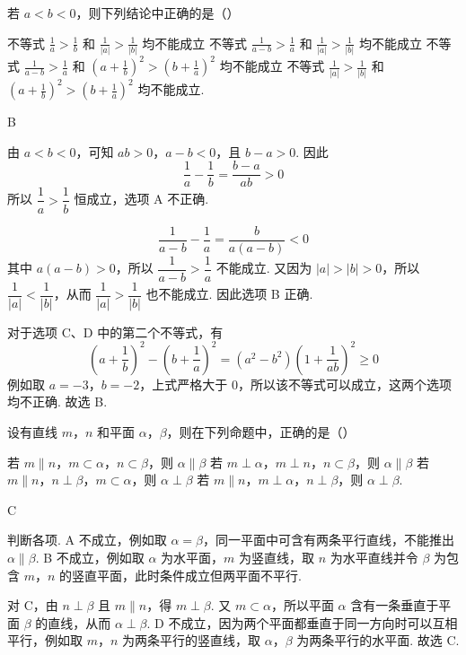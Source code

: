 \begin{problem}
若 \(a < b < 0\)，则下列结论中正确的是（\quad）

\choices
    {不等式 \(\frac{1}{a} > \frac{1}{b}\) 和 \(\frac{1}{|a|} > \frac{1}{|b|}\) 均不能成立}
    {不等式 \(\frac{1}{a - b} > \frac{1}{a}\) 和 \(\frac{1}{|a|} > \frac{1}{|b|}\) 均不能成立}
    {不等式 \(\frac{1}{a - b} > \frac{1}{a}\) 和 \(\left(a + \frac{1}{b}\right)^2 > \left(b + \frac{1}{a}\right)^2\) 均不能成立}
    {不等式 \(\frac{1}{|a|} > \frac{1}{|b|}\) 和 \(\left(a + \frac{1}{b}\right)^2 > \left(b + \frac{1}{a}\right)^2\) 均不能成立.}
\end{problem}

\begin{answer}
B
\end{answer}

\begin{solution}
由 \(a<b<0\)，可知 \(ab>0\)，\(a-b<0\)，且 \(b-a>0\). 因此
\[
\frac1a-\frac1b=\frac{b-a}{ab}>0
\]
所以 \(\dfrac1a>\dfrac1b\) 恒成立，选项 A 不正确.

\[
\frac1{a-b}-\frac1a=\frac{b}{a(a-b)}<0
\]
其中 \(a(a-b)>0\)，所以 \(\dfrac1{a-b}>\dfrac1a\) 不能成立. 又因为
\(|a|>|b|>0\)，所以 \(\dfrac1{|a|}<\dfrac1{|b|}\)，从而 \(\dfrac1{|a|}>\dfrac1{|b|}\) 也不能成立. 因此选项 B 正确.

对于选项 C、D 中的第二个不等式，有
\[
\left(a+\frac1b\right)^2-\left(b+\frac1a\right)^2
=(a^2-b^2)\left(1+\frac1{ab}\right)^2\ge0
\]
例如取 \(a=-3\)，\(b=-2\)，上式严格大于 \(0\)，所以该不等式可以成立，这两个选项均不正确. 故选 B.
\end{solution}

\begin{problem}
设有直线 \(m\)，\(n\) 和平面 \(\alpha\)，\(\beta\)，则在下列命题中，正确的是（\quad）

\choices
    {若 \(m \parallel n\)，\(m \subset \alpha\)，\(n \subset \beta\)，则 \(\alpha \parallel \beta\)}
    {若 \(m \perp \alpha\)，\(m \perp n\)，\(n \subset \beta\)，则 \(\alpha \parallel \beta\)}
    {若 \(m \parallel n\)，\(n \perp \beta\)，\(m \subset \alpha\)，则 \(\alpha \perp \beta\)}
    {若 \(m \parallel n\)，\(m \perp \alpha\)，\(n \perp \beta\)，则 \(\alpha \perp \beta\).}
\end{problem}

\begin{answer}
C
\end{answer}

\begin{solution}
判断各项. A 不成立，例如取 \(\alpha=\beta\)，同一平面中可含有两条平行直线，不能推出 \(\alpha\parallel\beta\). B 不成立，例如取 \(\alpha\) 为水平面，\(m\) 为竖直线，取 \(n\) 为水平直线并令 \(\beta\) 为包含 \(m\)，\(n\) 的竖直平面，此时条件成立但两平面不平行.

对 C，由 \(n\perp\beta\) 且 \(m\parallel n\)，得 \(m\perp\beta\). 又 \(m\subset\alpha\)，所以平面 \(\alpha\) 含有一条垂直于平面 \(\beta\) 的直线，从而 \(\alpha\perp\beta\). D 不成立，因为两个平面都垂直于同一方向时可以互相平行，例如取 \(m\)，\(n\) 为两条平行的竖直线，取 \(\alpha\)，\(\beta\) 为两条平行的水平面. 故选 C.
\end{solution}

